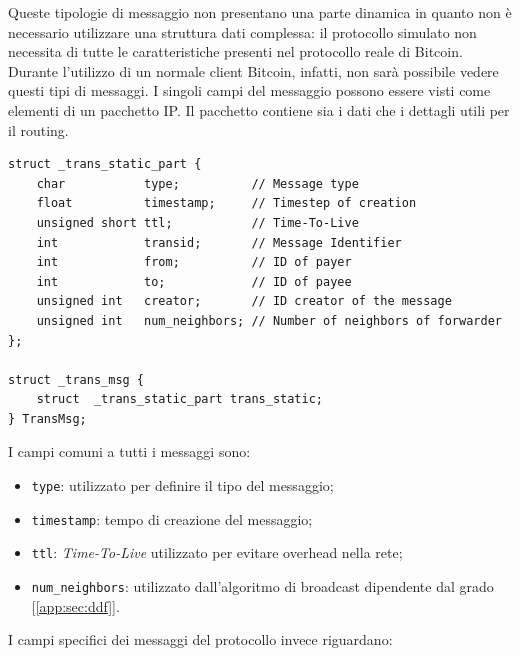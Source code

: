 Queste tipologie di messaggio non presentano una parte dinamica in quanto non è necessario utilizzare una struttura dati complessa: il protocollo simulato non necessita di tutte le caratteristiche presenti nel protocollo reale di Bitcoin. Durante l'utilizzo di un normale client Bitcoin, infatti, non sarà possibile vedere questi tipi di messaggi.\newline
I singoli campi del messaggio possono essere visti come elementi di un pacchetto IP. Il pacchetto contiene sia i dati che i dettagli utili per il routing.
\begin{code}
\begin{verbatim}
struct _trans_static_part {
    char           type;          // Message type
    float          timestamp;     // Timestep of creation
    unsigned short ttl;           // Time-To-Live
    int            transid;       // Message Identifier
    int            from;          // ID of payer
    int            to;            // ID of payee
    unsigned int   creator;       // ID creator of the message
    unsigned int   num_neighbors; // Number of neighbors of forwarder
};

struct _trans_msg {
    struct  _trans_static_part trans_static;
} TransMsg;
\end{verbatim}
\end{code}
I campi comuni a tutti i messaggi sono:
\begin{itemize}
    \item \texttt{type}: utilizzato per definire il tipo del messaggio;
    \item \texttt{timestamp}: tempo di creazione del messaggio;
    \item \texttt{ttl}: \textit{Time-To-Live} utilizzato per evitare overhead nella rete;
    \item \texttt{num\_neighbors}: utilizzato dall'algoritmo di broadcast dipendente dal grado [\ref{app:sec:ddf}].
\end{itemize}
I campi specifici dei messaggi del protocollo invece riguardano:
